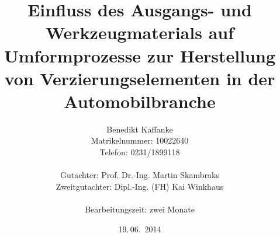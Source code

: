 \documentclass[12pt,a4paper,parskip,twoside,BCOR5mm,headsepline]{scrartcl}
\begin{document}
   
\titlehead{\textbf{\small Fachhochschule Südwestfalen\\
Fachbereich Maschinenbau\\
Verbundstudiengang Maschinenbau
\vspace{1,3cm}}}



  

\subject{\textcolor{blue}{\Huge{Bachelorarbeit \vspace{1,5cm}}}}


\title{Einfluss des Ausgangs- und  Werkzeugmaterials auf Umformprozesse zur Herstellung von Verzierungselementen in der Automobilbranche \vspace{1,3cm}}\\


\author{Benedikt Kaffanke\\
 Matrikelnummer: 10022640\\
Telefon: 0231/1899118\\
\\
Gutachter: Prof. Dr.-Ing. Martin Skambraks\\
Zweitgutachter: Dipl.-Ing. (FH) Kai Winkhaus\\
\\
Bearbeitungszeit: zwei Monate}
\date{19.\,06.~2014}





\maketitle\thispagestyle{empty}


\cleardoublepage

\newpage
{}

\tableofcontents
\cleardoublepage



\newpage
{}
\end{document}

